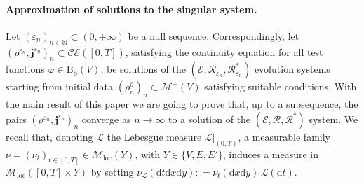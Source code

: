 \documentclass[11pt,reqno]{amsart}
\numberwithin{equation}{section}
\newcommand{\N}{\mathbb{N}}
\newcommand{\CE}[2]{\calC \calE([#1,#2])}
\newcommand{\calC}{\mathcal{C}}
\newcommand{\calE}{\mathcal{E}}
\newcommand{\calM}{\mathcal{M}}
\newcommand{\scrL}{\mathscr{L}}
\newcommand{\eps}{\varepsilon}
\newcommand{\dd}{\mathrm{d}}
\theoremstyle{definition}
\newcommand{\ep}{\varepsilon}
\let\eps\ep
\def\dd{\mathrm{d}}
\newcommand{\Bb}{\mathrm{B}_{\mathrm b}}
\newcommand{\Lebone}{\scrL}
\newcommand{\scrR}{\mathscr{R}}
\newcommand{\scrE}{\mathscr{E}}
\newcommand{\jj}{{\boldsymbol{j}}}
\newcommand{\Ed}{{E'}}
\newcommand{\Mloc}{\mathcal{M}_{\mathrm{loc}}}
\newcommand{\ej}{\eps_n}
\newcommand{\rmL}{\mathrm{L}}
\newcommand{\RCR}{\color{magenta}}
\newcommand{\TODO}[1]{\todo[inline, color=cyan!20]{#1}}
\newcommand{\EEE}{\color{black}}
\numberwithin{equation}{section}
\begin{document}
\paragraph{\bf Approximation of solutions to the singular system.}
 Let $(\ej)_{n\in \N} \subset (0,+\infty)$ be a null sequence. Correspondingly, let 
 $(\rho^{\ej},\jj^{\ej})_n \subset  \CE 0T$,
 \RCR satisfying the continuity equation for all test functions $\varphi \in \Bb(V)$, \EEE
  be solutions of the   $(\scrE,\scrR_{\ej},\scrR_{\ej}^*)$  evolution systems starting from initial data $(\rho_n^0)_n
 \subset \calM^+(V)$ satisfying suitable conditions.
 With the main result of this paper we are going to prove 
that, up to a subsequence, the pairs $(\rho^{\ej},\jj^{\ej})_n $ converge as $n\to\infty$ to a solution of the   $(\scrE,\scrR,\scrR^*)$  system.
We recall that, denoting $\Lebone$ the Lebesgue measure $\Lebone|_{(0,T)}$, a measurable family $\nu = (\nu_t)_{t\in [0,T]} \in \Mloc(Y)$,
with $Y\in \{ V,E, \Ed\}$, induces a measure in $\Mloc([0,T]{\times} Y)$ by setting $\nu_\Lebone (\dd t \dd x \dd y): = \nu_t(\dd x \dd y) \,\Lebone (\dd t)$. 
\end{document}

